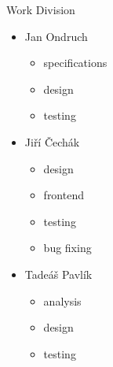 \documentclass[]{beamer}
\begin{document}
    \begin{frame}{Work Division}
      \begin{adjustwidth}{-1mm}{-1mm}
        \begin{multicols}{3}
          \begin{itemize}
            \item Jan Ondruch
            \begin{itemize}
              \item specifications
              \item design
              \item testing
            \end{itemize}

            \columnbreak

            \item Jiří Čechák\\[1mm]
            \begin{itemize}
              \item design
              \item frontend
              \item testing
              \item bug fixing
            \end{itemize}

            \columnbreak

            \item Tadeáš Pavlík
            \begin{itemize}
              \item analysis
              \item design
              \item testing
            \end{itemize}
          \end{itemize}
        \end{multicols}
      \end{adjustwidth}
    \end{frame}
\end{document}
